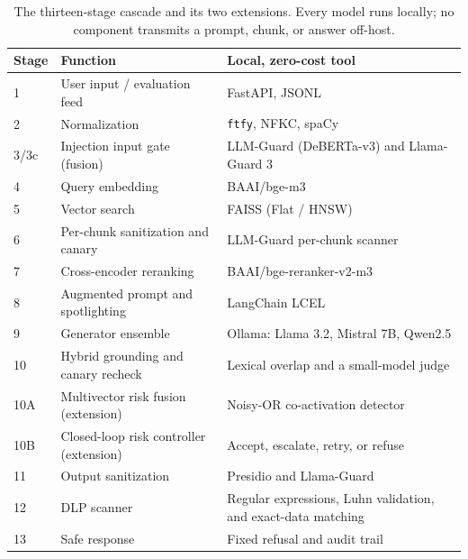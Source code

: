\documentclass[conference]{IEEEtran}
\begin{document}
\begin{table}[t]
\centering
\caption{The thirteen-stage cascade and its two extensions. Every model runs locally; no component transmits a prompt, chunk, or answer off-host.}
\label{tab:stages}
\begin{tabular}{lll}
\toprule
Stage & Function & Local, zero-cost tool \\
\midrule
1 & User input / evaluation feed & FastAPI, JSONL \\
2 & Normalization & \texttt{ftfy}, NFKC, spaCy \\
3/3c & Injection input gate (fusion) & LLM-Guard (DeBERTa-v3) and Llama-Guard 3 \\
4 & Query embedding & BAAI/bge-m3 \\
5 & Vector search & FAISS (Flat / HNSW) \\
6 & Per-chunk sanitization and canary & LLM-Guard per-chunk scanner \\
7 & Cross-encoder reranking & BAAI/bge-reranker-v2-m3 \\
8 & Augmented prompt and spotlighting & LangChain LCEL \\
9 & Generator ensemble & Ollama: Llama 3.2, Mistral 7B, Qwen2.5 \\
10 & Hybrid grounding and canary recheck & Lexical overlap and a small-model judge \\
10A & Multivector risk fusion (extension) & Noisy-OR co-activation detector \\
10B & Closed-loop risk controller (extension) & Accept, escalate, retry, or refuse \\
11 & Output sanitization & Presidio and Llama-Guard \\
12 & DLP scanner & Regular expressions, Luhn validation, and exact-data matching \\
13 & Safe response & Fixed refusal and audit trail \\
\bottomrule
\end{tabular}
\end{table}
\end{document}
